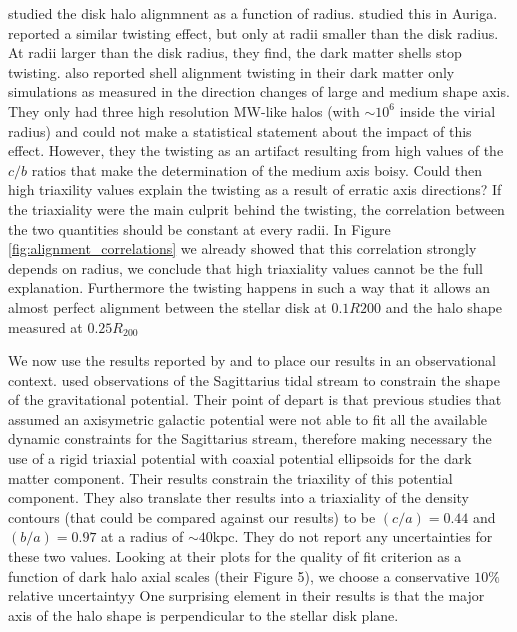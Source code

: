 \documentclass[a4paper,fleqn,usenatbib]{mnras}
\begin{document}
\cite{Bailin05} studied the disk halo alignmnent as a function of
radius.
\cite{Gomez17} studied this in Auriga.
\cite{Debattista13} reported a similar twisting effect, but only at radii smaller
than the disk radius. 
At radii larger than the disk radius, they find, the dark matter
shells stop twisting. 
\cite{JingSuto02} also reported shell alignment twisting in their dark
matter only simulations as measured in the direction changes of large
and medium shape axis. 
They only had three high resolution MW-like halos (with
$\sim 10^{6}$ inside the virial radius) and could not make a
statistical statement about the impact of this effect.
However, they the twisting as an artifact resulting from high values of the
$c/b$ ratios that make the determination of the medium axis boisy.
Could then high triaxility values explain the twisting as a result of
erratic axis directions? 
If the triaxiality were the main culprit behind the twisting, the
correlation between the two quantities should be constant at every
radii.
In Figure \ref{fig:alignment_correlations} we already showed that this
correlation strongly depends on radius, we conclude that high
triaxiality values cannot be the full explanation.
Furthermore the twisting happens in such a way that it allows an
almost perfect alignment between the stellar disk at $0.1R{200}$ and
the halo shape measured at $0.25R_{200}$ 

We now use the results reported by \cite{LM10} and \cite{Bovy16}
to place our results in an observational context.
\cite{LM10} used observations of the Sagittarius tidal stream to
constrain the shape of the gravitational potential.
Their point of depart is that previous studies that assumed an
axisymetric galactic potential were not able to fit all the available
dynamic constraints for the Sagittarius stream, therefore making
necessary the use of a rigid triaxial potential with coaxial potential
ellipsoids for the dark matter component.  
Their results constrain the triaxility of this potential
component. 
They also translate ther results into a triaxiality of the density
contours (that could be compared against our results)
 to be $(c/a)=0.44$ and $(b/a)=0.97$ at a radius of $\sim 40$kpc. 
They do not report any uncertainties for these two values. 
Looking at their plots for the quality of fit criterion as a function
of dark halo axial scales (their Figure 5), we choose a conservative $10\%$
relative uncertaintyy
One surprising element in their results is that  the major axis of the
halo shape is perpendicular to the stellar disk plane.  
\end{document}

